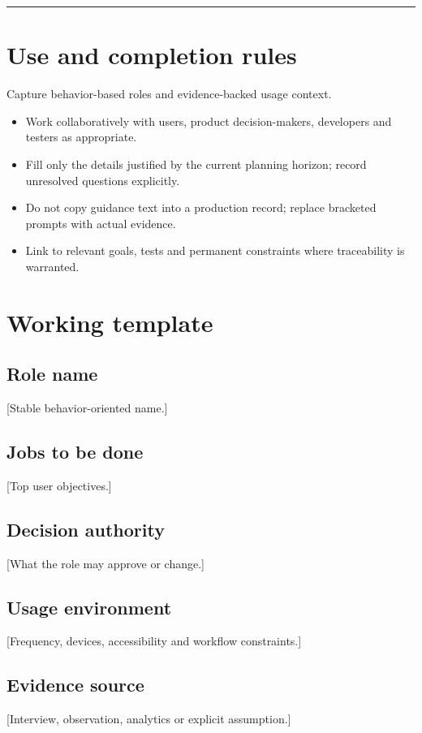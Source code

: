 \documentclass[11pt,letterpaper]{article}
\begin{document}
\tableofcontents\medskip\noindent\rule{\linewidth}{0.4pt}\medskip
\section{Use and completion rules}
Capture behavior-based roles and evidence-backed usage context.

\begin{itemize}[leftmargin=*,itemsep=2pt]
\item Work collaboratively with users, product decision-makers, developers and testers as appropriate.
\item Fill only the details justified by the current planning horizon; record unresolved questions explicitly.
\item Do not copy guidance text into a production record; replace bracketed prompts with actual evidence.
\item Link to relevant goals, tests and permanent constraints where traceability is warranted.
\end{itemize}
\section{Working template}
\subsection{Role name}
[Stable behavior-oriented name.]

\subsection{Jobs to be done}
[Top user objectives.]

\subsection{Decision authority}
[What the role may approve or change.]

\subsection{Usage environment}
[Frequency, devices, accessibility and workflow constraints.]

\subsection{Evidence source}
[Interview, observation, analytics or explicit assumption.]
\end{document}
